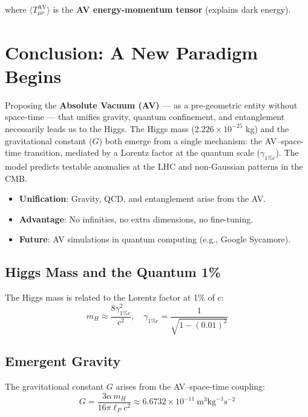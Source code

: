 \documentclass[a4paper]{article}
\theoremstyle{definition}
\theoremstyle{remark}
\numberwithin{equation}{section}
\begin{document}
where \(\langle T^{\text{AV}}_{\mu\nu} \rangle\) is the \textbf{AV energy-momentum tensor} (explains dark energy).

	

\section{Conclusion: A New Paradigm Begins}

\noindent
Proposing the \textbf{Absolute Vacuum (AV)} — as a pre-geometric entity without space-time — that unifies gravity, quantum confinement, and entanglement necessarily leads us to the Higgs. The Higgs mass ($2.226\times10^{-25}$ kg) and the gravitational constant ($G$) both emerge from a single mechanism: the AV–space-time transition, mediated by a Lorentz factor at the quantum scale ($\gamma_{1\%c}$). The model predicts testable anomalies at the LHC and non-Gaussian patterns in the CMB.

\begin{itemize}
	\item \textbf{Unification}: Gravity, QCD, and entanglement arise from the AV.
	\item \textbf{Advantage}: No infinities, no extra dimensions, no fine-tuning.
	\item \textbf{Future}: AV simulations in quantum computing (e.g., Google Sycamore).
\end{itemize}

\subsection{Higgs Mass and the Quantum 1\%}

The Higgs mass is related to the Lorentz factor at 1\% of $c$:
\begin{equation}
	m_H \approx \dfrac{8\gamma_{1\%c}^2}{c^2}, \quad \gamma_{1\%c} = \dfrac{1}{\sqrt{1-(0.01)^2}}
\end{equation}

\subsection{Emergent Gravity}

The gravitational constant $G$ arises from the AV–space-time coupling:
\begin{equation}
	G = \dfrac{3\alpha\, m_H}{16\pi \ell_P c^2} \approx 6.6732\times10^{-11} \ \text{m}^3\text{kg}^{-1}\text{s}^{-2}
\end{equation}
\end{document}

